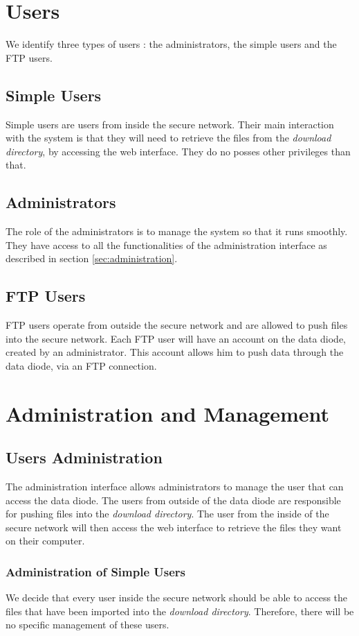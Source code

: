 \documentclass[a4paper,11pt]{article}
\begin{document}
\section{Users}
We identify three types of users : the administrators, the simple users and the FTP users.

\subsection{Simple Users}
Simple users are users from inside the secure network. Their main interaction with the system is that they will need to retrieve the files from the \textit{download directory}, by accessing the web interface. They do no posses other privileges than that.

\subsection{Administrators}
The role of the administrators is to manage the system so that it runs smoothly. They have access to all the functionalities of the administration interface as described in section \ref{sec:administration}.

\subsection{FTP Users}
FTP users operate from outside the secure network and are allowed to push files into the secure network. Each FTP user will have an account on the data diode, created by an administrator. This account allows him to push data through the data diode, via an FTP connection.

\section{Administration and Management}
\subsection{Users Administration}
The administration interface allows administrators to manage the user that can access the data diode. The users from outside of the data diode are responsible for pushing files into the \textit{download directory}. The user from the inside of the secure network will then access the web interface to retrieve the files they want on their computer.

\subsubsection{Administration of Simple Users}
We decide that every user inside the secure network should be able to access the files that have been imported into the \textit{download directory}. Therefore, there will be no specific management of these users.
\end{document}
